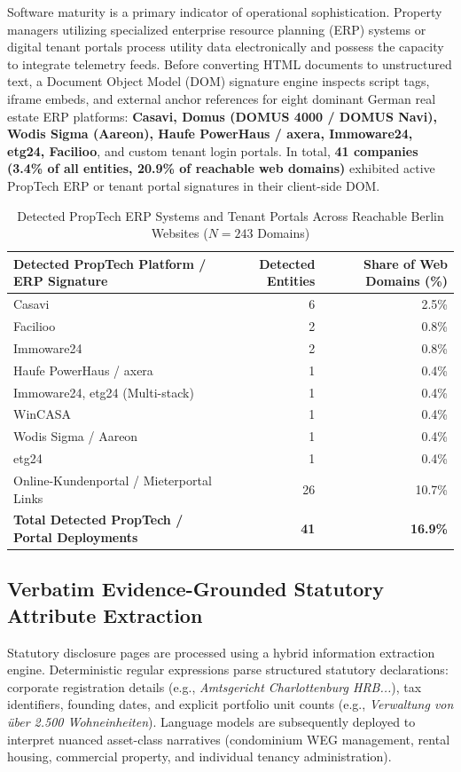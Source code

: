 \documentclass[11pt,a4paper]{article}
\begin{document}
Software maturity is a primary indicator of operational sophistication. Property managers utilizing specialized enterprise resource planning (ERP) systems or digital tenant portals process utility data electronically and possess the capacity to integrate telemetry feeds. Before converting HTML documents to unstructured text, a Document Object Model (DOM) signature engine inspects script tags, iframe embeds, and external anchor references for eight dominant German real estate ERP platforms: \textbf{Casavi, Domus (DOMUS 4000 / DOMUS Navi), Wodis Sigma (Aareon), Haufe PowerHaus / axera, Immoware24, etg24, Facilioo}, and custom tenant login portals. In total, \textbf{41 companies (3.4\% of all entities, 20.9\% of reachable web domains)} exhibited active PropTech ERP or tenant portal signatures in their client-side DOM.

\begin{table}[htbp]
\centering
\caption{Detected PropTech ERP Systems and Tenant Portals Across Reachable Berlin Websites ($N = 243$ Domains)}
\label{tab:erp}
\footnotesize
\begin{tabularx}{\textwidth}{l r r}
\toprule
\textbf{Detected PropTech Platform / ERP Signature} & \textbf{Detected Entities} & \textbf{Share of Web Domains (\%)} \\
\midrule
Casavi & 6 & 2.5\% \\
Facilioo & 2 & 0.8\% \\
Immoware24 & 2 & 0.8\% \\
Haufe PowerHaus / axera & 1 & 0.4\% \\
Immoware24, etg24 (Multi-stack) & 1 & 0.4\% \\
WinCASA & 1 & 0.4\% \\
Wodis Sigma / Aareon & 1 & 0.4\% \\
etg24 & 1 & 0.4\% \\
Online-Kundenportal / Mieterportal Links & 26 & 10.7\% \\
\midrule
\textbf{Total Detected PropTech / Portal Deployments} & \textbf{41} & \textbf{16.9\%} \\
\bottomrule
\end{tabularx}
\end{table}

\subsection{Verbatim Evidence-Grounded Statutory Attribute Extraction}
Statutory disclosure pages are processed using a hybrid information extraction engine. Deterministic regular expressions parse structured statutory declarations: corporate registration details (e.g., \textit{Amtsgericht Charlottenburg HRB...}), tax identifiers, founding dates, and explicit portfolio unit counts (e.g., \textit{Verwaltung von \"uber 2.500 Wohneinheiten}). Language models are subsequently deployed to interpret nuanced asset-class narratives (condominium WEG management, rental housing, commercial property, and individual tenancy administration).
\end{document}
